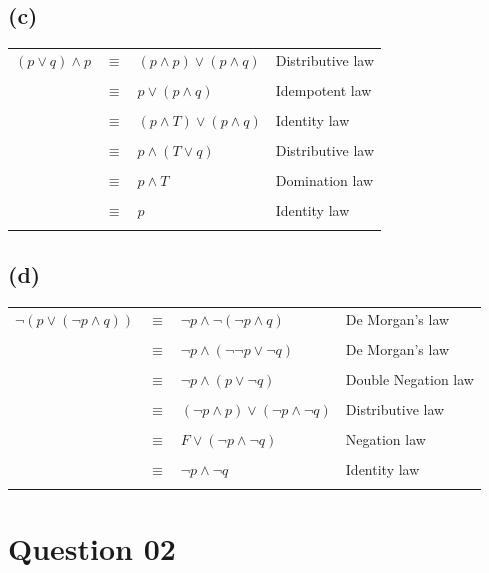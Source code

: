 \documentclass[a4paper,12pt]{article}
\begin{document}
\subsection{(c)}
\begin{tabular}{lcll} 
    $(p \lor q) \land p$ & $\equiv$ & $(p \land p) \lor (p \land q)$ & Distributive law\\\\
     & $\equiv$ & $p \lor (p \land q)$ & Idempotent law\\\\
     & $\equiv$ & $(p \land T) \lor (p \land q)$ & Identity law\\\\
     & $\equiv$ & $p \land (T \lor q)$ & Distributive law\\\\
     & $\equiv$ &$p \land T$ & Domination law\\\\
     & $\equiv$ &$p$ & Identity law\\\\
\end{tabular}

\subsection{(d)}
\begin{tabular}{lcll} 
$\neg (p \lor (\neg p \land q))$ & $\equiv$ & $\neg p \land \neg (\neg p \land q)$ & De Morgan's law\\\\
 & $\equiv$ & $\neg p \land (\neg \neg p \lor \neg q)$ & De Morgan's law\\\\
 & $\equiv$ & $\neg p \land (p \lor \neg q)$ & Double Negation law\\\\
 & $\equiv$ & $(\neg p \land p) \lor (\neg p \land \neg q)$ & Distributive law\\\\
 & $\equiv$ & $F \lor (\neg p \land \neg q)$ & Negation law\\\\
 & $\equiv$ & $\neg p \land \neg q$ & Identity law\\\\
\end{tabular}
\newpage
\section{Question 02}
\end{document}
